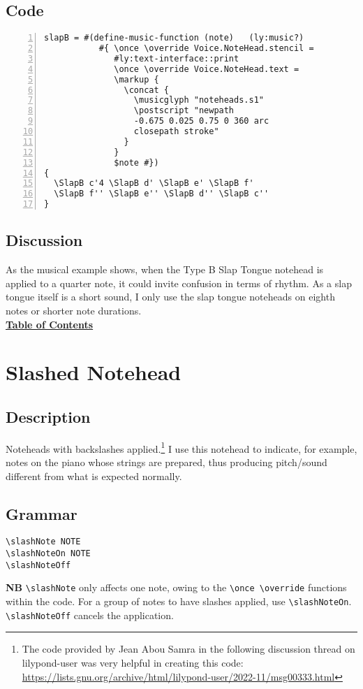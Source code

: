\subsection{Code}
\begin{Verbatim}[numbers=left,xleftmargin=5mm]
slapB = #(define-music-function (note)   (ly:music?)
           #{ \once \override Voice.NoteHead.stencil =
              #ly:text-interface::print
              \once \override Voice.NoteHead.text =
              \markup {
                \concat {
                  \musicglyph "noteheads.s1"
                  \postscript "newpath 
                  -0.675 0.025 0.75 0 360 arc 
                  closepath stroke"
                }
              }
              $note #})
{
  \SlapB c'4 \SlapB d' \SlapB e' \SlapB f'
  \SlapB f'' \SlapB e'' \SlapB d'' \SlapB c''
}

\end{Verbatim}
\subsection{Discussion}
As the musical example shows, when the Type B Slap Tongue notehead is applied to a quarter note, it could invite confusion in terms of rhythm. As a slap tongue itself is a short sound, I only use the slap tongue noteheads on eighth notes or shorter note durations. \\
\break
\hyperref[sec:toc]{\textbf{Table of Contents}}

\vfill \break


\section {Slashed Notehead}
\hfill
\subsection{Description}
Noteheads with backslashes applied.\footnote{The code provided by Jean Abou Samra in the following discussion thread on lilypond-user was very helpful in creating this code: \url{https://lists.gnu.org/archive/html/lilypond-user/2022-11/msg00333.html}} I use this notehead to indicate, for example, notes on the piano whose strings are prepared, thus producing pitch/sound different from what is expected normally. 

\subsection{Grammar}
\begin{verbatim}
\slashNote NOTE
\slashNoteOn NOTE
\slashNoteOff 
\end{verbatim}
\textbf{NB} \verb|\slashNote| only affects one note, owing to the \verb|\once \override| functions within the code. For a group of notes to have slashes applied, use \verb|\slashNoteOn|. \verb|\slashNoteOff| cancels the application.
